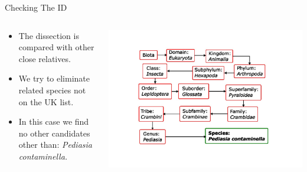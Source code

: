 \documentclass[
  ignorenonframetext,
]{beamer}
\providecommand{\tightlist}{%
  \setlength{\itemsep}{0pt}\setlength{\parskip}{0pt}}
\begin{document}
\begin{frame}{Checking The ID}
\protect\hypertarget{checking-the-id}{}
\begin{columns}[T]
\begin{column}{0.5\textwidth}
\begin{itemize}
\tightlist
\item
  The dissection is compared with other close relatives.
\item
  We try to eliminate related species not on the UK list.
\item
  In this case we find no other candidates other than: \emph{Pediasia
  contaminella.}
\end{itemize}
\end{column}

\begin{column}{0.5\textwidth}
\includegraphics{./images/species.jpg}
\end{column}
\end{columns}
\end{frame}
\end{document}
